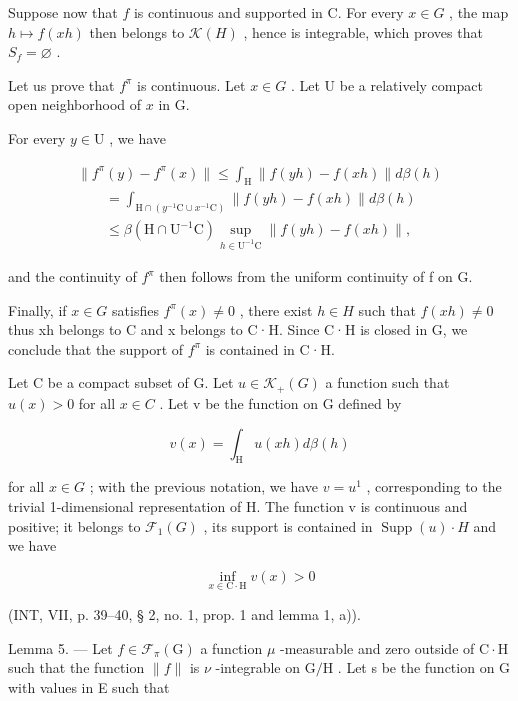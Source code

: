 Suppose now that \(f\) is continuous and supported in C. For every \(x \in G\) , the map \(h \mapsto f(xh)\) then belongs to \(\mathcal{K}(H)\) , hence is integrable, which proves that \(S_f = \varnothing\) .

Let us prove that \(f^{\pi}\) is continuous. Let \(x \in G\) . Let U be a relatively compact open neighborhood of \(x\) in G.

For every \(y \in \mathrm{U}\) , we have

\[
\begin{array}{l} \| f ^ {\pi} (y) - f ^ {\pi} (x) \| \leqslant \int_ {\mathrm{H}} \| f (y h) - f (x h) \|   d \beta (h) \\ \qquad = \int_ {\mathrm{H} \cap (y ^ {- 1} \mathrm{C} \cup x ^ {- 1} \mathrm{C})} \| f (y h) - f (x h) \|   d \beta (h) \\ \qquad \leqslant \beta (\mathrm{H} \cap \mathrm{U} ^ {- 1} \mathrm{C}) \sup _ {h \in \mathrm{U} ^ {- 1} \mathrm{C}} \| f (y h) - f (x h) \|, \end{array}
\]

and the continuity of \(f^{\pi}\) then follows from the uniform continuity of f on G.

Finally, if \(x \in G\) satisfies \(f^{\pi}(x) \neq 0\) , there exist \(h \in H\) such that \(f(xh) \neq 0\) thus xh belongs to C and x belongs to C·H. Since C·H is closed in G, we conclude that the support of \(f^{\pi}\) is contained in C·H.

 Let C be a compact subset of G. Let \(u \in \mathcal{K}_{+}(G)\) a function such that \(u(x) > 0\) for all \(x \in C\) . Let v be the function on G defined by

\[
v (x) = \int_ {\mathrm{H}} u (x h) d \beta (h)\tag{4}
\]

for all \(x \in G\) ; with the previous notation, we have \(v = u^{1}\) , corresponding to the trivial 1-dimensional representation of H. The function v is continuous and positive; it belongs to \(\mathcal{F}_{1}(G)\) , its support is contained in \(\operatorname{Supp}(u) \cdot H\) and we have

\[
\inf _ {x \in \mathrm{C} \cdot \mathrm{H}} v (x) > 0\tag{5}
\]

(INT, VII, p. 39--40, § 2, no. 1, prop. 1 and lemma 1, a)).

Lemma 5. --- Let \(f \in \mathcal{F}_{\pi}(\mathrm{G})\) a function \(\mu\) -measurable and zero outside of \(\mathrm{C} \cdot \mathrm{H}\) such that the function \(\|f\|\) is \(\nu\) -integrable on \(\mathrm{G}/\mathrm{H}\) . Let s be the function on \(\mathrm{G}\) with values in E such that


